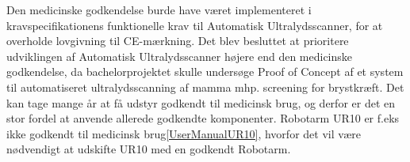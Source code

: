Den medicinske godkendelse burde have været implementeret i kravspecifikationens funktionelle krav til Automatisk Ultralydsscanner, for at overholde lovgivning til CE-mærkning. Det blev besluttet at prioritere udviklingen af Automatisk Ultralydsscanner højere end den medicinske godkendelse, da bachelorprojektet skulle undersøge Proof of Concept af et system til automatiseret ultralydsscanning af mamma mhp. screening for brystkræft. Det kan tage mange år at få udstyr godkendt til medicinsk brug, og derfor er det en stor fordel at anvende allerede godkendte komponenter. Robotarm UR10 er f.eks ikke godkendt til medicinsk brug\ref{UserManualUR10}, hvorfor det vil være nødvendigt at udskifte UR10 med en godkendt Robotarm. 


 
